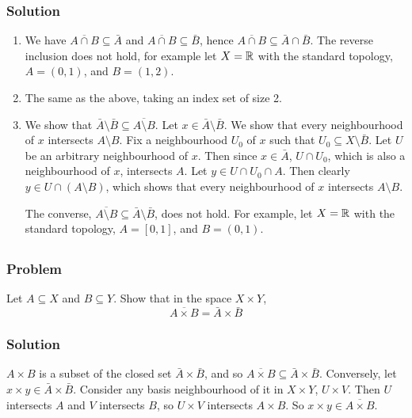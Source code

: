 \subsubsection{Solution}
\begin{enumerate}
 \item We have $\overline{A \cap B} \subseteq \bar A$ and $\overline{A \cap B} \subseteq \bar B$, hence $\overline{A \cap B} \subseteq \bar A \cap \bar B$. The reverse inclusion does not hold, for example let $X = \mathbb R$ with the standard topology, $A = (0,1)$, and $B = (1,2)$.
 
 \item The same as the above, taking an index set of size 2.
 
 \item We show that $\bar A \setminus \bar B \subseteq \overline{A \setminus B}$. Let $x \in \bar A \setminus \bar B$. We show that every neighbourhood of $x$ intersects $A \setminus B$. Fix a neighbourhood $U_0$ of $x$ such that $U_0 \subseteq X \setminus \bar B$. Let $U$ be an arbitrary neighbourhood of $x$. Then since $x \in \bar A$, $U \cap U_0$, which is also a neighbourhood of $x$, intersects $A$. Let $y \in U \cap U_0 \cap A$. Then clearly $y \in U \cap (A \setminus B)$, which shows that every neighbourhood of $x$ intersects $A \setminus B$.
 
 The converse, $\overline{A \setminus B} \subseteq \bar A \setminus \bar B$, does not hold. For example, let $X = \mathbb R$ with the standard topology, $A = [0,1]$, and $B = (0,1)$. 
\end{enumerate}


\setcounter{subsection}{8} %
\subsection{}
\subsubsection{Problem}
Let $A \subseteq X$ and $B \subseteq Y$. Show that in the space $X \times Y$,
\[\overline{A \times B} = \bar A \times \bar B \]
\subsubsection{Solution}
$A \times B$ is a subset of the closed set $\bar A \times \bar B$, and so $\overline{A \times B} \subseteq \bar A \times \bar B$. Conversely, let $x \times y \in \bar A \times \bar B$. Consider any basis neighbourhood of it in $X \times Y$, $U \times V$. Then $U$ intersects $A$ and $V$ intersects $B$, so $U \times V$ intersects $A \times B$. So $x \times y \in \overline{A \times B}$. 

